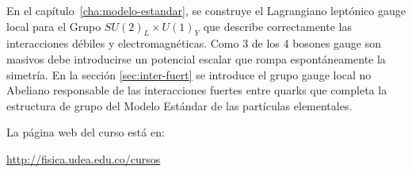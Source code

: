 En el capítulo~\ref{cha:modelo-estandar}, se construye el Lagrangiano leptónico gauge local para el Grupo $SU(2)_L\times U(1)_Y$ que describe correctamente las interacciones débiles y electromagnéticas. Como 3 de los 4 bosones gauge son masivos debe introducirse un potencial escalar que rompa espontáneamente la simetría. En la sección \ref{sec:inter-fuert} se introduce el grupo gauge local no Abeliano responsable de las interacciones fuertes entre quarks que completa la estructura de grupo del Modelo Estándar de las partículas elementales. 

La página web del curso está en:

\url{http://fisica.udea.edu.co/cursos}%





